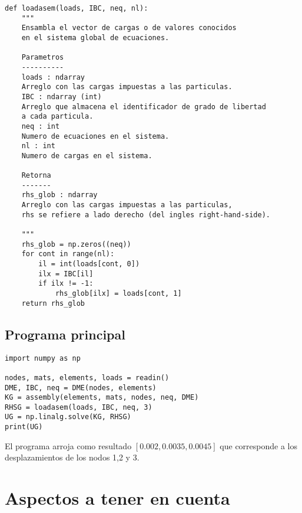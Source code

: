 \begin{verbatim}
def loadasem(loads, IBC, neq, nl):
    """
    Ensambla el vector de cargas o de valores conocidos
    en el sistema global de ecuaciones.
    
    Parametros
    ----------
    loads : ndarray
    Arreglo con las cargas impuestas a las particulas.
    IBC : ndarray (int)
    Arreglo que almacena el identificador de grado de libertad
    a cada particula.
    neq : int
    Numero de ecuaciones en el sistema.
    nl : int
    Numero de cargas en el sistema.
    
    Retorna
    -------
    rhs_glob : ndarray
    Arreglo con las cargas impuestas a las particulas,
    rhs se refiere a lado derecho (del ingles right-hand-side).
    
    """
    rhs_glob = np.zeros((neq))
    for cont in range(nl):
        il = int(loads[cont, 0])
        ilx = IBC[il]
        if ilx != -1:
            rhs_glob[ilx] = loads[cont, 1]
    return rhs_glob
\end{verbatim}


\subsection{Programa principal}

\begin{verbatim}
import numpy as np

nodes, mats, elements, loads = readin()
DME, IBC, neq = DME(nodes, elements)
KG = assembly(elements, mats, nodes, neq, DME)
RHSG = loadasem(loads, IBC, neq, 3)
UG = np.linalg.solve(KG, RHSG)
print(UG)
\end{verbatim}

El programa arroja como resultado
$[0.002 , 0.0035 ,  0.0045]$
que corresponde a los desplazamientos de los nodos 1,2 y 3.




\section{Aspectos a tener en cuenta}

